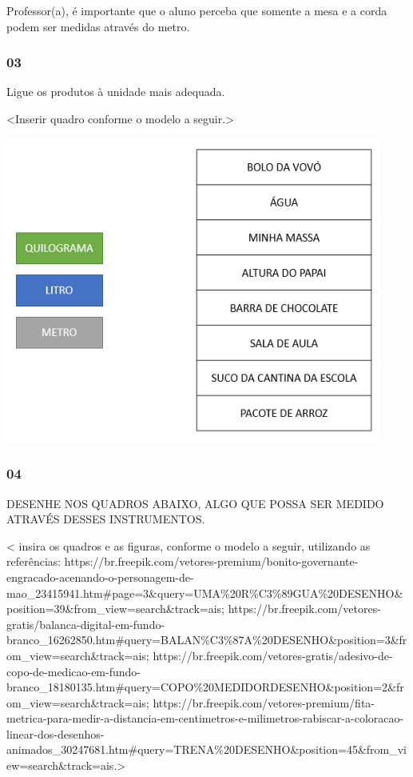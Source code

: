 Professor(a), é importante que o aluno perceba que somente a mesa e a
corda podem ser medidas através do metro.

\subsubsection{03}\label{section-29}

Ligue os produtos à unidade mais adequada.

\textless{}Inserir quadro conforme o modelo a seguir.\textgreater{}

\includegraphics[width=4.86920in,height=3.96016in]{media/image25.png}

\subsubsection{04}\label{section-30}

DESENHE NOS QUADROS ABAIXO, ALGO QUE POSSA SER MEDIDO ATRAVÉS DESSES
INSTRUMENTOS.

\textless{} insira os quadros e as figuras, conforme o modelo a seguir,
utilizando as referências:
https://br.freepik.com/vetores-premium/bonito-governante-engracado-acenando-o-personagem-de-mao\_23415941.htm\#page=3\&query=UMA\%20R\%C3\%89GUA\%20DESENHO\&position=39\&from\_view=search\&track=ais;
https://br.freepik.com/vetores-gratis/balanca-digital-em-fundo-branco\_16262850.htm\#query=BALAN\%C3\%87A\%20DESENHO\&position=3\&from\_view=search\&track=ais;
https://br.freepik.com/vetores-gratis/adesivo-de-copo-de-medicao-em-fundo-branco\_18180135.htm\#query=COPO\%20MEDIDORDESENHO\&position=2\&from\_view=search\&track=ais;
https://br.freepik.com/vetores-premium/fita-metrica-para-medir-a-distancia-em-centimetros-e-milimetros-rabiscar-a-coloracao-linear-dos-desenhos-animados\_30247681.htm\#query=TRENA\%20DESENHO\&position=45\&from\_view=search\&track=ais.\textgreater{}

